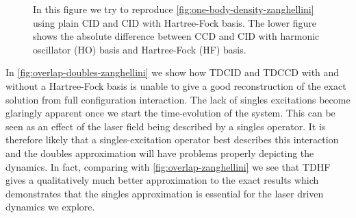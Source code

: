 \begin{figure}
            \caption{In this figure we try to reproduce
            \autoref{fig:one-body-density-zanghellini} using plain CID and CID with
            Hartree-Fock basis.
            The lower figure shows the absolute difference between CCD and CID
            with harmonic oscillator (HO) basis and Hartree-Fock (HF) basis.}
            \label{fig:one-body-density-doubles-zanghellini}
        \end{figure}

        In \autoref{fig:overlap-doubles-zanghellini} we show how TDCID and TDCCD
        with and without a Hartree-Fock basis is unable to give a good
        reconstruction of the exact solution from full configuration
        interaction.
        The lack of singles excitations become glaringly apparent once we start
        the time-evolution of the system.
        This can be seen as an effect of the laser field being described by a
        singles operator.
        It is therefore likely that a singles-excitation operator best describes
        this interaction and the doubles approximation will have problems
        properly depicting the dynamics.
        In fact, comparing with \autoref{fig:overlap-zanghellini} we see that
        TDHF gives a qualitatively much better approximation to the exact
        results which demonstrates that the singles approximation is essential
        for the laser driven dynamics we explore.

